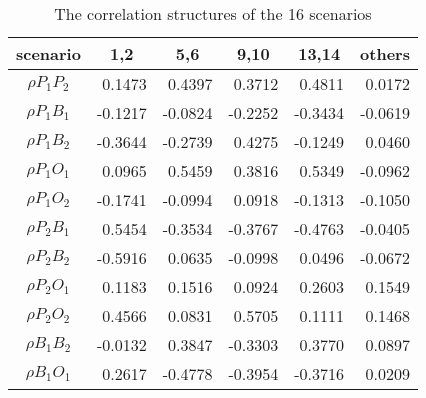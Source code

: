 \documentclass[letterpaper]{article}
\begin{document}
\begin{table}[h]
\centering
\caption{The correlation structures of the 16 scenarios}
\begin{tabular}{crrrrr}
\hline
scenario       & \multicolumn{1}{c}{1,2} & \multicolumn{1}{c}{5,6} & \multicolumn{1}{c}{9,10} & \multicolumn{1}{c}{13,14} & \multicolumn{1}{c}{others} \\ \hline
$\rho{P_1P_2}$ & 0.1473                  & 0.4397                  & 0.3712                   & 0.4811                    & 0.0172                                     \\
$\rho{P_1B_1}$ & -0.1217                 & -0.0824                 & -0.2252                  & -0.3434                   & -0.0619                                    \\
$\rho{P_1B_2}$ & -0.3644                 & -0.2739                 & 0.4275                   & -0.1249                   & 0.0460                                     \\
$\rho{P_1O_1}$ & 0.0965                  & 0.5459                  & 0.3816                   & 0.5349                    & -0.0962                                    \\
$\rho{P_1O_2}$ & -0.1741                 & -0.0994                 & 0.0918                   & -0.1313                   & -0.1050                                    \\
$\rho{P_2B_1}$ & 0.5454                  & -0.3534                 & -0.3767                  & -0.4763                   & -0.0405                                    \\
$\rho{P_2B_2}$ & -0.5916                 & 0.0635                  & -0.0998                  & 0.0496                    & -0.0672                                    \\
$\rho{P_2O_1}$ & 0.1183                  & 0.1516                  & 0.0924                   & 0.2603                    & 0.1549                                     \\
$\rho{P_2O_2}$ & 0.4566                  & 0.0831                  & 0.5705                   & 0.1111                    & 0.1468                                     \\
$\rho{B_1B_2}$ & -0.0132                 & 0.3847                  & -0.3303                  & 0.3770                    & 0.0897                                     \\
$\rho{B_1O_1}$ & 0.2617                  & -0.4778                 & -0.3954                  & -0.3716                   & 0.0209                                     \\

\end{tabular}
\end{table}
\end{document}

